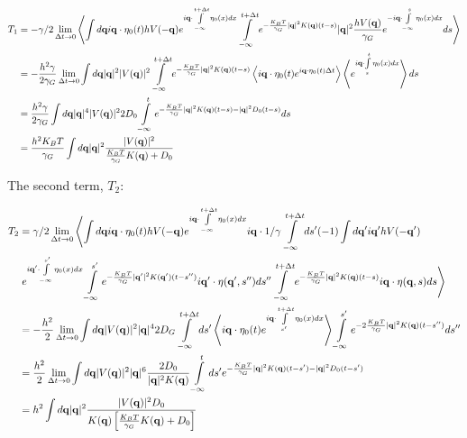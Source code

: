 \documentclass[amsmath,preprintnumbers,10pt,article,notitlepage]{revtex4-1}
\begin{document}
\begin{align}
T_1 & =  -\gamma/2   \lim_{\Delta t \to 0}  \left \langle \int d{\bf q}  i{\bf q} \cdot \eta_0(t)  hV(-{\bf q})  e^{i{\bf q} \cdot \int\limits_{-\infty}^{t+\Delta t} \eta_0(x)dx} \int\limits_{-\infty}^{t+\Delta t} e^{-\frac{K_BT}{\gamma_G}|{\bf q}|^2 K({\bf q})(t-s)} |{\bf q}|^2 \dfrac{h  V({\bf q})}{\gamma_G} e^{-i{\bf q} \cdot \int\limits_{-\infty}^{s} \eta_0(x) dx}  ds \right \rangle \\
& =  -\frac{h^2 \gamma}{2\gamma_G}   \lim_{\Delta t \to 0} \int d{\bf q}  |{\bf q}|^2 |V({\bf q})|^2   \int\limits_{-\infty}^{t+\Delta t} e^{-\frac{K_BT}{\gamma_G}|{\bf q}|^2 K({\bf q})(t-s)} \left \langle i{\bf q} \cdot \eta_0(t) e^{i{\bf q} \cdot  \eta_0(t) \Delta t} \right \rangle \left \langle e^{i{\bf q} \cdot \int\limits_{s}^{t} \eta_0(x) dx} \right \rangle ds  \\
& =  \frac{h^2 \gamma}{2\gamma_G}  \int d{\bf q}  |{\bf q}|^4 |V({\bf q})|^2 2D_0  \int\limits_{-\infty}^{t} e^{-\frac{K_BT}{\gamma_G}|{\bf q}|^2 K({\bf q})(t-s) - |{\bf q}|^2 D_0(t-s)} ds  \\
& =  \frac{h^2 K_BT}{\gamma_G} \int d{\bf q} |{\bf q}|^2  \dfrac{ |V({\bf q})|^2}{ \frac{K_BT}{\gamma_G} K({\bf q}) + D_0}   \\
\label{eq:NoiseForceT1Equil}
\end{align}

The second term, $T_2$:

\begin{align}
T_2 & =  \gamma/2   \lim_{\Delta t \to 0}  \left \langle  \int d{\bf q}  i{\bf q} \cdot \eta_0(t)   h V(-{\bf q}) e^{i{\bf q} \cdot \int\limits_{-\infty}^{t+\Delta t} \eta_0(x)dx}  i{\bf q}  \cdot  1/\gamma \int\limits_{-\infty}^{t+\Delta t} ds' (-1) \int d{\bf q}' i{\bf q'}  h V(-{ \bf q}') \right. \\
& \left. e^{i{\bf q}' \cdot \int\limits_{-\infty}^{s'} \eta_0(x)dx} \int\limits_{-\infty}^{s'} e^{-\frac{K_BT}{\gamma_G} |{\bf q}'|^2 K({\bf q'})(t-s'')} i{\bf q}' \cdot \eta({\bf q'}, s'') ds''  \int\limits_{-\infty}^{t+\Delta t} e^{-\frac{K_BT}{\gamma_G}|{\bf q}|^2 K({\bf q})(t-s)} i{\bf q} \cdot \eta({\bf q}, s) ds\right \rangle \\
& = -\frac{h^2}{2}   \lim_{\Delta t \to 0} \int d{\bf q}   |V({\bf q})|^2  |{\bf q}|^4 2D_G \int\limits_{-\infty}^{t+\Delta t} ds'  \left \langle  i{\bf q} \cdot \eta_0(t) e^{i{\bf q} \cdot \int\limits_{s'}^{t+\Delta t} \eta_0(x)dx} \right \rangle \int\limits_{-\infty}^{s'} e^{-2\frac{K_BT}{\gamma_G} |{\bf q}|^2 K({\bf q})(t-s'')} ds'' \\
& = \frac{h^2}{2}   \lim_{\Delta t \to 0} \int d{\bf q}  |V({\bf q})|^2 |{\bf q}|^6 \dfrac{2D_0}{|{\bf q}|^2 K({\bf q})}  \int\limits_{-\infty}^{t} ds' e^{-\frac{K_BT}{\gamma_G} |{\bf q}|^2 K({\bf q})(t-s') - |{\bf q}|^2 D_0(t-s')} \\
& = h^2  \int d{\bf q} |{\bf q}|^2  \dfrac{|V({\bf q})|^2 D_0}{K({\bf q})\left[\frac{K_BT}{\gamma_G} K({\bf q}) + D_0\right]}    \\
\label{eq:NoiseForceT2Equil}
\end{align}
\end{document}
